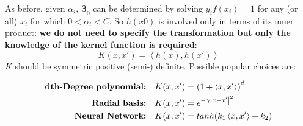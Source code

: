 \documentclass[12pt, letterpaper]{article}
\theoremstyle{definition}
\newcommand{\be}{\mathbf{\beta}}
\DeclarePairedDelimiter\autobracket{(}{)}
\newcommand{\br}[1]{\autobracket*{#1}}
\begin{document}
As before, given $\alpha_i$, $\be_0$ can be determined by solving $y_i f(x_i) = 1$ for any (or all) $x_i$ for which $0<\alpha_i <C$.
So $h(x0)$ is involved only in terms of its inner product: \textbf{we do not need to specify the transformation but only the knowledge of the kernel function is required}:
\begin{equation}
K(x, x') = \left\langle  h(x), h(x')  \right\rangle
\end{equation}
$K$ should be symmetric positive (semi-) definite.   Possible popular choices are:

\begin{equation}
\begin{aligned}
\textbf{dth-Degree polynomial:} &\quad K(x, x') = \br{1+\left\langle  x,x'  \right\rangle}^d\\
\textbf{Radial basis:} &\quad K(x, x') =e^{-\gamma\left| x-x' \right|^2}\\
\textbf{Neural Network:} &\quad K(x, x') = tanh\br{k_1\left\langle  x,x'  \right\rangle+k_2}\\
\end{aligned}
\end{equation}
\end{document}
